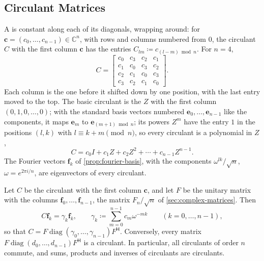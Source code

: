 \subsection{Circulant Matrices}

A  is constant along each of its diagonals, wrapping around: for $\mathbf c=(c_0,\ldots,c_{n-1})\in\mathbb C^n$, with rows and columns numbered from $0$, the circulant $C$ with the first column $\mathbf c$ has the entries $C_{lm}\coloneqq c_{(l-m)\bmod n}$. For $n=4$,
\[
C=\begin{bmatrix}c_0&c_3&c_2&c_1\\c_1&c_0&c_3&c_2\\c_2&c_1&c_0&c_3\\c_3&c_2&c_1&c_0\end{bmatrix}.
\]
Each column is the one before it shifted down by one position, with the last entry moved to the top. The basic circulant is the  $Z$ with the first column $(0,1,0,\ldots,0)$; with the standard basis vectors numbered $\mathbf e_0,\ldots,\mathbf e_{n-1}$ like the components, it maps $\mathbf e_m$ to $\mathbf e_{(m+1)\bmod n}$; its powers $Z^m$ have the entry $1$ in the positions $(l,k)$ with $l\equiv k+m\pmod n$, so every circulant is a polynomial in $Z$,
\[
C=c_0I+c_1Z+c_2Z^2+\cdots+c_{n-1}Z^{n-1}.
\]
The Fourier vectors $\mathbf f_k$ of \cref{prop:fourier-basis}, with the components $\omega^{lk}/\sqrt n$, $\omega=e^{2\pi i/n}$, are eigenvectors of every circulant.

\begin{theorem}
\label{thm:circulant}
Let $C$ be the circulant with the first column $\mathbf c$, and let $F$ be the unitary matrix with the columns $\mathbf f_0,\ldots,\mathbf f_{n-1}$, the matrix $F_n/\sqrt n$ of \cref{sec:complex-matrices}. Then
\[
C\mathbf f_k=\gamma_k\mathbf f_k,\qquad\gamma_k\coloneqq\sum_{m=0}^{n-1}c_m\omega^{-mk}\qquad(k=0,\ldots,n-1),
\]
so that $C=F\operatorname{diag}(\gamma_0,\ldots,\gamma_{n-1})F^{\mathsf H}$. Conversely, every matrix $F\operatorname{diag}(d_0,\ldots,d_{n-1})F^{\mathsf H}$ is a circulant. In particular, all circulants of order $n$ commute, and sums, products and inverses of circulants are circulants.
\end{theorem}

